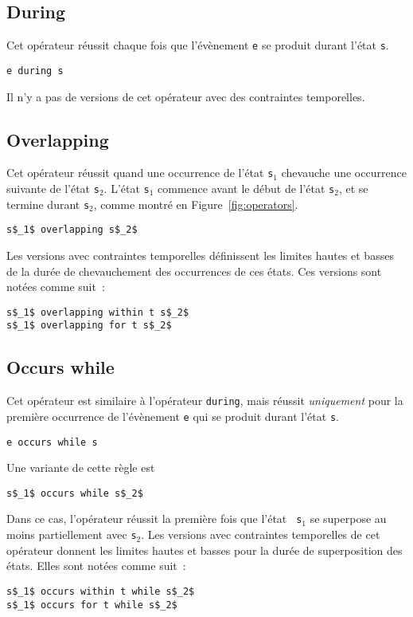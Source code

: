 \subsection{During}
Cet opérateur réussit chaque fois que l'évènement {\tt e} se produit
durant l'état {\tt s}.
\begin{lstlisting}[language=MaloyaText]
e during s
\end{lstlisting}
Il n'y a pas de versions de cet opérateur avec des contraintes
temporelles.

\subsection{Overlapping}
Cet opérateur réussit quand une occurrence de l'état {\tt s$_1$} chevauche 
une occurrence suivante de l'état
{\tt s$_2$}. L'état {\tt s$_1$} commence avant le début de l'état 
{\tt s$_2$}, et se termine durant {\tt s$_2$}, comme montré en 
Figure~\ref{fig:operators}. 
\begin{lstlisting}[language=MaloyaText]
s$_1$ overlapping s$_2$
\end{lstlisting}

Les versions avec contraintes temporelles définissent les limites
hautes et basses de la durée de chevauchement des occurrences de ces
états. Ces versions sont notées comme suit~:
\begin{lstlisting}[language=MaloyaText]
s$_1$ overlapping within t s$_2$
s$_1$ overlapping for t s$_2$
\end{lstlisting}

\subsection{Occurs while}
Cet opérateur est similaire à l'opérateur {\tt during}, mais réussit
{\em uniquement} pour la première occurrence de l'évènement {\tt e} qui se 
produit durant l'état {\tt s}.
\begin{lstlisting}[language=MaloyaText]
e occurs while s
\end{lstlisting} 
Une variante de cette règle est 
\begin{lstlisting}[language=MaloyaText]
s$_1$ occurs while s$_2$
\end{lstlisting}
Dans ce cas, l'opérateur réussit la première fois que l'état {\tt
  s$_1$} se superpose au moins partiellement avec {\tt s$_2$}. Les
versions avec contraintes temporelles de cet opérateur donnent les
limites hautes et basses pour la durée de superposition des
états. Elles sont notées comme suit~:
\begin{lstlisting}[language=MaloyaText]
s$_1$ occurs within t while s$_2$
s$_1$ occurs for t while s$_2$
\end{lstlisting}


